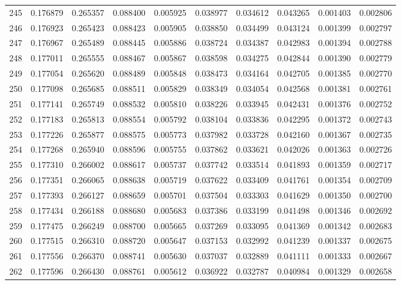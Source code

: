 \begin{tabular}{lrrrrrrrrr}
245 & 0.176879 & 0.265357 & 0.088400 & 0.005925 & 0.038977 & 0.034612 & 0.043265 & 0.001403 & 0.002806 \\
246 & 0.176923 & 0.265423 & 0.088423 & 0.005905 & 0.038850 & 0.034499 & 0.043124 & 0.001399 & 0.002797 \\
247 & 0.176967 & 0.265489 & 0.088445 & 0.005886 & 0.038724 & 0.034387 & 0.042983 & 0.001394 & 0.002788 \\
248 & 0.177011 & 0.265555 & 0.088467 & 0.005867 & 0.038598 & 0.034275 & 0.042844 & 0.001390 & 0.002779 \\
249 & 0.177054 & 0.265620 & 0.088489 & 0.005848 & 0.038473 & 0.034164 & 0.042705 & 0.001385 & 0.002770 \\
250 & 0.177098 & 0.265685 & 0.088511 & 0.005829 & 0.038349 & 0.034054 & 0.042568 & 0.001381 & 0.002761 \\
251 & 0.177141 & 0.265749 & 0.088532 & 0.005810 & 0.038226 & 0.033945 & 0.042431 & 0.001376 & 0.002752 \\
252 & 0.177183 & 0.265813 & 0.088554 & 0.005792 & 0.038104 & 0.033836 & 0.042295 & 0.001372 & 0.002743 \\
253 & 0.177226 & 0.265877 & 0.088575 & 0.005773 & 0.037982 & 0.033728 & 0.042160 & 0.001367 & 0.002735 \\
254 & 0.177268 & 0.265940 & 0.088596 & 0.005755 & 0.037862 & 0.033621 & 0.042026 & 0.001363 & 0.002726 \\
255 & 0.177310 & 0.266002 & 0.088617 & 0.005737 & 0.037742 & 0.033514 & 0.041893 & 0.001359 & 0.002717 \\
256 & 0.177351 & 0.266065 & 0.088638 & 0.005719 & 0.037622 & 0.033409 & 0.041761 & 0.001354 & 0.002709 \\
257 & 0.177393 & 0.266127 & 0.088659 & 0.005701 & 0.037504 & 0.033303 & 0.041629 & 0.001350 & 0.002700 \\
258 & 0.177434 & 0.266188 & 0.088680 & 0.005683 & 0.037386 & 0.033199 & 0.041498 & 0.001346 & 0.002692 \\
259 & 0.177475 & 0.266249 & 0.088700 & 0.005665 & 0.037269 & 0.033095 & 0.041369 & 0.001342 & 0.002683 \\
260 & 0.177515 & 0.266310 & 0.088720 & 0.005647 & 0.037153 & 0.032992 & 0.041239 & 0.001337 & 0.002675 \\
261 & 0.177556 & 0.266370 & 0.088741 & 0.005630 & 0.037037 & 0.032889 & 0.041111 & 0.001333 & 0.002667 \\
262 & 0.177596 & 0.266430 & 0.088761 & 0.005612 & 0.036922 & 0.032787 & 0.040984 & 0.001329 & 0.002658 \\

\end{tabular}
